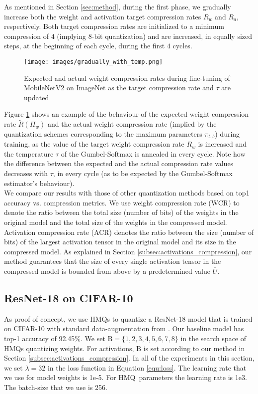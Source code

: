 \documentclass{article}
\newcommand{\bitset}{\mathrm{B}}
\newcommand{\qb}{HMQ}
\begin{document}
As mentioned in Section \ref{sec:method}, during the first phase, we gradually increase both the weight and activation target compression rates $R_w$ and $R_a$, respectively.
Both target compression rates are initialized to a minimum compression of $4$ (implying 8-bit quantization) and are increased, in equally sized steps, at the beginning of each cycle, during the first $4$ cycles.
\begin{figure}
	\centering
	\texttt{[image: images/gradually\_with\_temp.png]}
	\caption{
		Expected and actual weight compression rates during fine-tuning of MobileNetV2 on ImageNet as the target compression rate and $\tau$ are updated
	}
\label{fig:gradually_inc}
\end{figure}

Figure \ref{fig:gradually_inc} shows an example of the behaviour of the expected weight compression rate $\tilde{R}(\Pi_w)$ and the actual weight compression rate (implied by the quantization schemes corresponding to the maximum parameters $\pi_{t, b}$) during training, as the value of the target weight compression rate $R_w$ is increased and the temperature $\tau$ of the Gumbel-Softmax is annealed in every cycle.
Note how the difference between the expected and the actual compression rate values decreases with $\tau$, in every cycle (as to be expected by the Gumbel-Softmax estimator's behaviour).\\

We compare our results with those of other quantization methods based on top1 accuracy vs. compression metrics.
We use weight compression rate (WCR) to denote the ratio between the total size (number of bits) of the weights in the original model and the total size of the weights in the compressed model.
Activation compression rate (ACR) denotes the ratio between the size (number of bits) of the largest activation tensor in the original model and its size in the compressed model.
As explained in Section \ref{subsec:activations_compression}, our method guarantees that the size of every single activation tensor in the compressed model is bounded from above by a predetermined value $\overline{U}$.

\subsection{ResNet-18 on CIFAR-10}\label{subsec:cifar10}


As proof of concept, we use \qb s to quantize a ResNet-18 model that is trained on \mbox{CIFAR-10} with standard data-augmentation from \cite{he2016deep}. 
Our baseline model has top-1 accuracy of 92.45\%. 
We set $\bitset=\{1,2,3,4,5,6,7,8\}$ in the search space of \qb s quantizing weights.
For activations, $\bitset$ is set according to our method in Section \ref{subsec:activations_compression}. 
In all of the experiments in this section, we set $\lambda=32$ in the loss function in Equation \ref{equ:loss}.
The learning rate that we use for model weights is 1e-5. 
For \qb\ parameters the learning rate is 1e3.
The batch-size that we use is 256.\\
\end{document}
